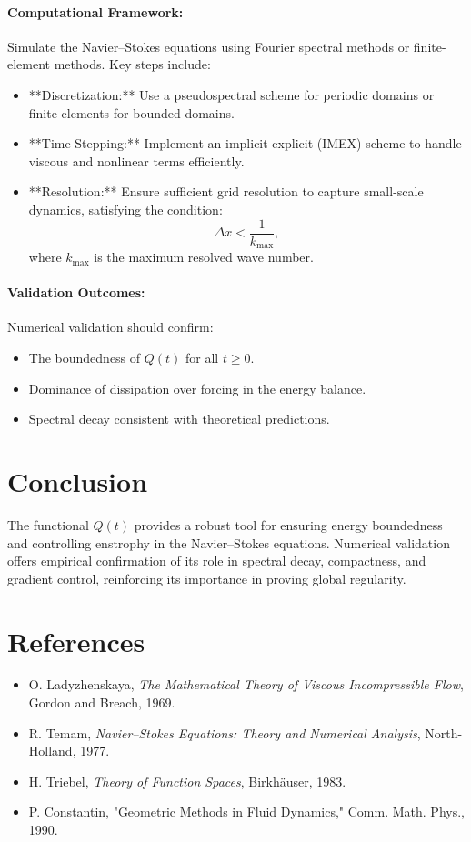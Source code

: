 \paragraph{Computational Framework:}
Simulate the Navier--Stokes equations using Fourier spectral methods or finite-element methods. Key steps include:
\begin{itemize}
    \item **Discretization:** Use a pseudospectral scheme for periodic domains or finite elements for bounded domains.
    \item **Time Stepping:** Implement an implicit-explicit (IMEX) scheme to handle viscous and nonlinear terms efficiently.
    \item **Resolution:** Ensure sufficient grid resolution to capture small-scale dynamics, satisfying the condition:
    \begin{equation}
    \Delta x < \frac{1}{k_{\max}},
    \end{equation}
    where $k_{\max}$ is the maximum resolved wave number.
\end{itemize}

\paragraph{Validation Outcomes:}
Numerical validation should confirm:
\begin{itemize}
    \item The boundedness of $Q(t)$ for all $t \geq 0$.
    \item Dominance of dissipation over forcing in the energy balance.
    \item Spectral decay consistent with theoretical predictions.
\end{itemize}

\section*{Conclusion}
The functional $Q(t)$ provides a robust tool for ensuring energy boundedness and controlling enstrophy in the Navier--Stokes equations. Numerical validation offers empirical confirmation of its role in spectral decay, compactness, and gradient control, reinforcing its importance in proving global regularity.

\section*{References}
\begin{itemize}
    \item O. Ladyzhenskaya, \emph{The Mathematical Theory of Viscous Incompressible Flow}, Gordon and Breach, 1969.
    \item R. Temam, \emph{Navier--Stokes Equations: Theory and Numerical Analysis}, North-Holland, 1977.
    \item H. Triebel, \emph{Theory of Function Spaces}, Birkh\"auser, 1983.
    \item P. Constantin, "Geometric Methods in Fluid Dynamics," Comm. Math. Phys., 1990.
\end{itemize}

